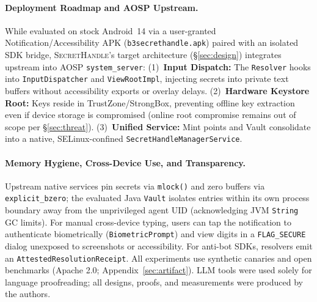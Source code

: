 \documentclass[sigconf,10pt]{acmart}
\newcommand{\SH}{\textsc{SecretHandle}}
\theoremstyle{acmplain}%
\begin{document}
\paragraph{Deployment Roadmap and AOSP Upstream.}
While evaluated on stock Android~14 via a user-granted Notification/Accessibility APK (\texttt{b3secrethandle.apk}) paired with an isolated SDK bridge, \SH's target architecture (\S\ref{sec:design}) integrates upstream into AOSP \texttt{system\_server}: (1)~\textbf{Input Dispatch:} The \texttt{Resolver} hooks into \texttt{InputDispatcher} and \texttt{ViewRootImpl}, injecting secrets into private text buffers without accessibility exports or overlay delays. (2)~\textbf{Hardware Keystore Root:} Keys reside in TrustZone/StrongBox, preventing offline key extraction even if device storage is compromised (online root compromise remains out of scope per \S\ref{sec:threat}). (3)~\textbf{Unified Service:} Mint points and Vault consolidate into a native, SELinux-confined \texttt{SecretHandleManagerService}.

\paragraph{Memory Hygiene, Cross-Device Use, and Transparency.}
Upstream native services pin secrets via \texttt{mlock()} and zero buffers via \texttt{explicit\_bzero}; the evaluated Java \texttt{Vault} isolates entries within its own process boundary away from the unprivileged agent UID (acknowledging JVM \texttt{String} GC limits). For manual cross-device typing, users can tap the notification to authenticate biometrically (\texttt{BiometricPrompt}) and view digits in a \texttt{FLAG\_SECURE} dialog unexposed to screenshots or accessibility. For anti-bot SDKs, resolvers emit an \texttt{AttestedResolutionReceipt}. All experiments use synthetic canaries and open benchmarks (Apache 2.0; Appendix~\ref{sec:artifact}). LLM tools were used solely for language proofreading; all designs, proofs, and measurements were produced by the authors.
\end{document}
